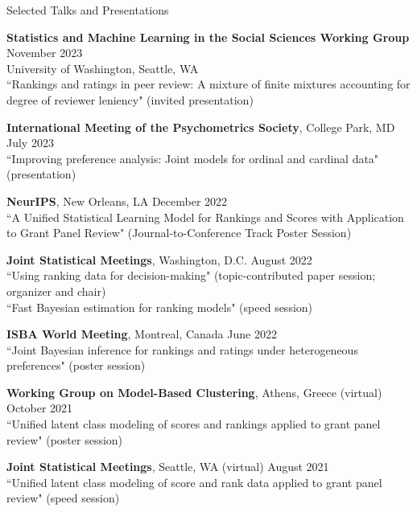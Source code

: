 \documentclass{resume} %
\begin{document}
\begin{rSection}{Selected Talks and Presentations}

\textbf{Statistics and Machine Learning in the Social Sciences Working Group} \hfill{November 2023}\\
University of Washington, Seattle, WA \\
``Rankings and ratings in peer review: A mixture of finite mixtures accounting for degree of reviewer leniency" (invited presentation)

\textbf{International Meeting of the Psychometrics Society}, College Park, MD \hfill{July 2023}\\
``Improving preference analysis: Joint models for ordinal and cardinal data" (presentation)

\textbf{NeurIPS}, New Orleans, LA \hfill {December 2022}\\
``A Unified Statistical Learning Model for Rankings and Scores with Application to Grant Panel Review" (Journal-to-Conference Track Poster Session)

\textbf{Joint Statistical Meetings}, Washington, D.C. \hfill {August 2022}\\
``Using ranking data for decision-making" (topic-contributed paper session; organizer and chair)\\
``Fast Bayesian estimation for ranking models" (speed session)

\textbf{ISBA World Meeting}, Montreal, Canada \hfill {June 2022}\\
``Joint Bayesian inference for rankings and ratings under heterogeneous preferences" (poster session)

\textbf{Working Group on Model-Based Clustering}, Athens, Greece (virtual)  \hfill {October 2021}\\
``Unified latent class modeling of scores and rankings applied to grant panel review" (poster session)

\textbf{Joint Statistical Meetings}, Seattle, WA (virtual) \hfill {August 2021}\\
``Unified latent class modeling of score and rank data applied to grant panel review" (speed session)

\end{rSection}
\end{document}
